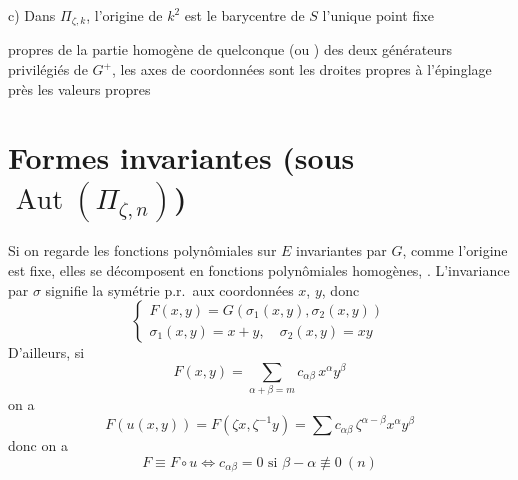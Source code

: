 \documentclass[11pt,a4paper]{article}
\begin{document}
c) Dans $\Pi_{\zeta,k}$, l'origine de $k^{2}$ est  le barycentre de $S$   l'unique point fixe   \ill{}  \ill{} 

propres de la partie homogène de \struck{\ill{}}  quelconque (ou ) des deux générateurs privilégiés de $G^{+}$, les axes de coordonnées sont les droites propres \struck{\ill{}}  \uncertain{\ill{}} à l'épinglage près les valeurs propres 

\section{Formes invariantes (sous $\operatorname{Aut}(\Pi_{\zeta,n})$)}

Si on regarde les fonctions polynômiales \struck{\ill{}} sur $E$ invariantes par $G$, comme l'origine est fixe, elles se décomposent en fonctions polynômiales homogènes,  . L'invariance par $\sigma$ signifie la symétrie p.r.\ aux  coordonnées  $x$, $y$, donc
\[
\begin{cases}
F(x,y) = G(\sigma_1(x,y), \sigma_2(x,y)) \\
\sigma_1(x,y) = x + y, \quad \sigma_2(x,y) = xy
\end{cases}
\]
D'ailleurs, si
\[
F(x,y) = \sum_{\alpha+\beta = m} c_{\alpha\beta}\, x^{\alpha} y^{\beta}
\]
on a
\[
F(u(x,y)) = F(\zeta x, \zeta^{-1} y) = \sum c_{\alpha\beta}\, \zeta^{\alpha-\beta} x^{\alpha} y^{\beta}
\]
donc on a
\[
F \equiv F \circ u \iff c_{\alpha\beta} = 0 \text{ si } \beta - \alpha \not\equiv 0 \ (n)
\]
\end{document}
